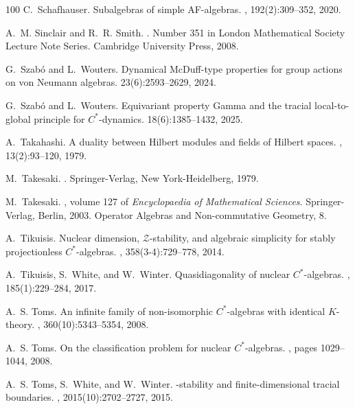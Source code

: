 \documentclass[a4paper,11pt]{amsart}
\theoremstyle{definition}
\numberwithin{equation}{section}
\numberwithin{theorem}{section}
\begin{document}
\begin{thebibliography}{100}
C.~Schafhauser.
\newblock Subalgebras of simple {AF}-algebras.
, 192(2):309--352, 2020.

A.~M. Sinclair and R.~R. Smith.
.
\newblock Number 351 in London Mathematical Society Lecture Note Series.
  Cambridge University Press, 2008.

G.~Szab\'o and L.~Wouters.
\newblock Dynamical {McDuff}-type properties for group actions on von {N}eumann
  algebras.
 23(6):2593--2629, 2024.

G.~Szab\'o and L.~Wouters.
\newblock Equivariant property {G}amma and the tracial local-to-global
  principle for {$C^*$}-dynamics.
 18(6):1385--1432, 2025.

A.~Takahashi.
\newblock A duality between {H}ilbert modules and fields of {H}ilbert spaces.
, 13(2):93--120, 1979.

M.~Takesaki.
.
\newblock Springer-Verlag, New York-Heidelberg, 1979.

M.~Takesaki.
, volume 127 of {\em
  Encyclopaedia of Mathematical Sciences}.
\newblock Springer-Verlag, Berlin, 2003.
\newblock Operator Algebras and Non-commutative Geometry, 8.

A.~Tikuisis.
\newblock Nuclear dimension, {$\mathcal {Z}$}-stability, and algebraic
  simplicity for stably projectionless {$C^*$}-algebras.
, 358(3-4):729--778, 2014.

A.~Tikuisis, S.~White, and W.~Winter.
\newblock Quasidiagonality of nuclear {$C^*$}-algebras.
, 185(1):229--284, 2017.

A.~S. Toms.
\newblock An infinite family of non-isomorphic {$C^*$}-algebras with identical
  {$K$}-theory.
, 360(10):5343--5354, 2008.

A.~S. Toms.
\newblock On the classification problem for nuclear {$C^*$}-algebras.
, pages 1029--1044, 2008.

A.~S. Toms, S.~White, and W.~Winter.
-stability and finite-dimensional tracial boundaries.
, 2015(10):2702--2727, 2015.


\end{thebibliography}
\end{document}
